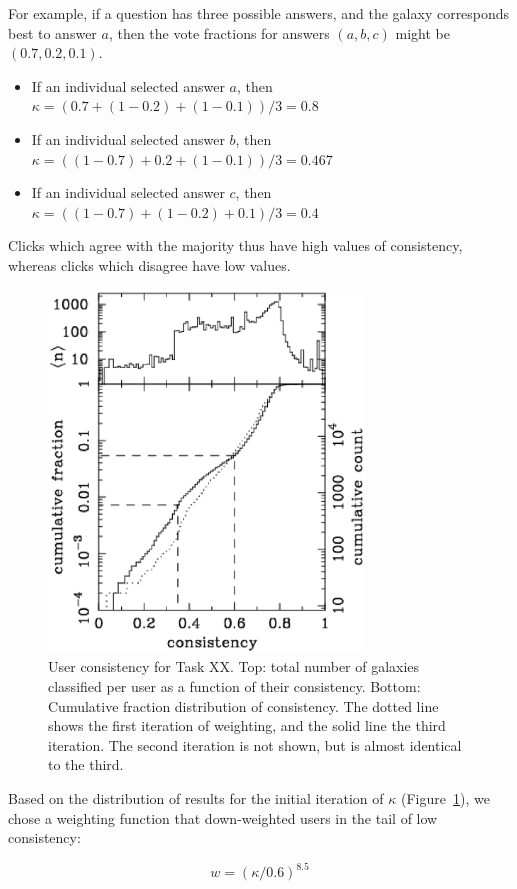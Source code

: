 \documentclass[useAMS,usenatbib]{mn2e}
\begin{document}
For example, if a question has three possible answers, and the galaxy corresponds best to answer $a$, then the vote fractions for answers $(a, b, c)$ might be $(0.7, 0.2, 0.1)$.
\begin{itemize}
\item If an individual selected answer $a$, then $\kappa = (0.7 + (1-0.2) + (1-0.1))/3 = 0.8$
\item If an individual selected answer $b$, then $\kappa = ((1-0.7) + 0.2 + (1-0.1))/3 = 0.467$
\item If an individual selected answer $c$, then $\kappa = ((1-0.7) + (1-0.2) + 0.1)/3 = 0.4$
\end{itemize}
\noindent Clicks which agree with the majority thus have high values of consistency, whereas clicks which disagree have low values.

\begin{figure}
\includegraphics[angle=0,width=3.3in]{figures/user_consistency.eps}
\caption{User consistency for Task XX. Top: total number of galaxies classified per user as a function of their consistency. Bottom: Cumulative fraction distribution of consistency. The dotted line shows the first iteration of weighting, and the solid line the third iteration. The second iteration is not shown, but is almost identical to the third. 
\label{fig-consistency}}
\end{figure}

Based on the distribution of results for the initial iteration of $\kappa$ (Figure~\ref{fig-consistency}), we chose a weighting function that down-weighted users in the tail of low consistency:

\begin{equation}
w = (\kappa/0.6)^{8.5}
\label{eqn-weight}
\end{equation}
\end{document}
